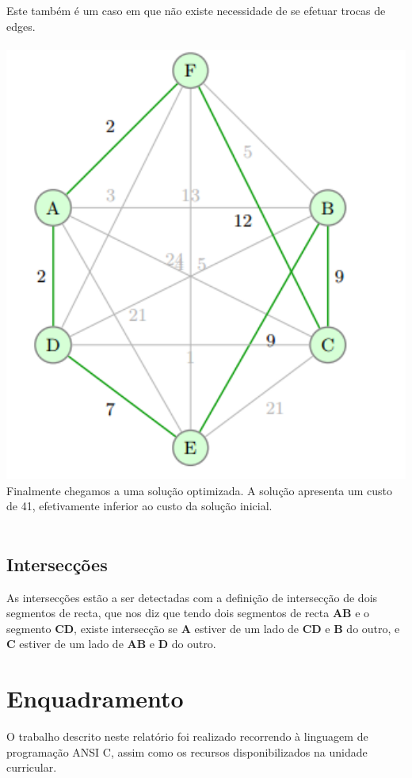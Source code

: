 \documentclass[12pt,a4paper,portrait]{article}
\begin{document}
			Este também é um caso em que não existe necessidade de se efetuar trocas de edges.\\\\
			\includegraphics[width=1.0\textwidth]{imagens/9}
			Finalmente chegamos a uma solução optimizada. A solução apresenta um custo de 41, efetivamente inferior ao custo da solução inicial.\\\\
			\newpage
			\subsection{Intersecções}
			As intersecções estão a ser detectadas com a definição de intersecção de dois segmentos de recta, que nos diz que tendo dois segmentos de recta \textbf{AB} e o segmento \textbf{CD}, existe intersecção se \textbf{A} estiver de um lado de \textbf{CD} e \textbf{B} do outro, e \textbf{C} estiver de um lado de \textbf{AB} e \textbf{D} do outro.
	\section{Enquadramento}
	O trabalho descrito neste relatório foi realizado recorrendo à linguagem de programação ANSI C, assim como os recursos disponibilizados na unidade curricular.\\
\end{document}

